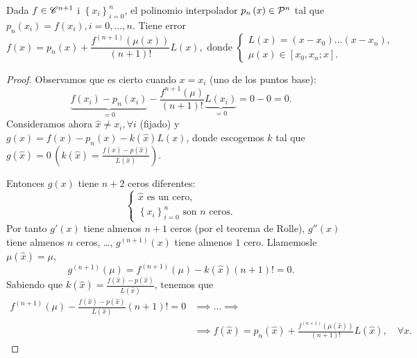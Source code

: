 \begin{teo}
    Dada $f\in \mathscr{C}^{n+1}$ i $\left\{ x_i \right\}_{i=0}^n$, el polinomio interpolador $p_n\left( x \right)\in \mathcal{P}^n$ tal que $p_n\left( x_i \right) = f\left( x_i \right), i=0,\dots,n$. Tiene error
    \[
        f\left( x \right) = p_n\left( x \right) + \frac{f^{\left( n+1 \right)}\left( \mu\left( x \right) \right)}{\left( n+1 \right)!}L\left( x \right), \text{ donde }
        \begin{cases}
            L\left( x \right) = \left( x-x_0 \right) \dots \left( x-x_n \right), \\
            \mu\left( x \right) \in \left[ x_0, x_n; x \right].
        \end{cases}
    \]
\end{teo}

\begin{proof}
    Observamos que es cierto cuando $x=x_i$ (uno de los puntos base):
    \[
        \underbrace{f\left( x_i \right) - p_n\left( x_i \right)}_{=0} - \frac{f^{n+1}\left( \mu \right)}{\left( n+1 \right)!}\underbrace{L\left( x_i \right)}_{=0} = 0-0 = 0.
    \]
    Consideramos ahora $\hat{x} \neq x_i, \forall i$ (fijado) y $g\left( x \right) = f\left( x \right) - p_n\left( x \right) - k\left( \hat{x} \right)L\left( x \right)$, donde escogemos $k$ tal que $g\left( \hat{x} \right) = 0\, \left( k\left( \hat{x} \right) = \frac{f\left( \hat{x} \right) - p\left( \hat{x} \right)}{L\left( \hat{x} \right)} \right)$.
    
    \noindent Entonces $g\left( x \right)$ tiene $n+2$ ceros diferentes:
    \[
        \begin{cases}
            \hat{x} \text{ es un cero},\\
            \left\{ x_i \right\}_{i=0}^n \text{ son }n\text{ ceros}.
        \end{cases}
    \]
    Por tanto $g'\left( x \right)$ tiene almenos $n+1$ ceros (por el teorema de Rolle), $g''\left( x \right)$ tiene almenos $n$ ceros, \dots, $g^{\left( n+1 \right)} \left( x \right)$ tiene almenos $1$ cero. Llamemosle $\mu\left( \hat{x} \right) = \mu$,
    \[
        g^{\left( n+1 \right)}\left( \mu \right) = f^{\left( n+1 \right)}\left( \mu \right) - k\left( \hat{x} \right)\left( n+1 \right)! = 0.
    \]
    Sabiendo que $k\left( \hat{x} \right) = \frac{f\left( \hat{x} \right) - p\left( \hat{x} \right)}{L\left( \hat{x} \right)}$, tenemos que
    \begin{align*}
        f^{\left( n+1 \right)}\left( \mu \right) - \frac{f\left( \hat{x} \right) - p\left( \hat{x} \right)}{L\left( \hat{x} \right)}\left( n+1 \right)! = 0 &\implies \dots \implies\\
        &\implies f\left( \hat{x} \right) = p_n\left( \hat{x} \right) + \frac{f^{\left( n+1 \right)}\left( \mu\left( \hat{x} \right) \right)}{\left( n+1 \right)!}L\left( \hat{x} \right),\quad \forall \hat{x}.
    \end{align*}
\end{proof}

